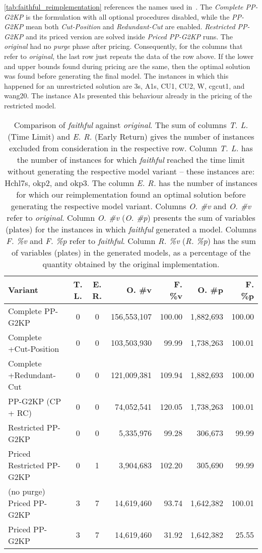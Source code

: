 \documentclass[smallextended]{svjour3}       %
\begin{document}
\autoref{tab:faithful_reimplementation} references the names used in~\cite{furini:2016,dimitri_thesis}.
The \emph{Complete PP-G2KP} is the formulation with all optional procedures disabled, while the \emph{PP-G2KP} mean both \emph{Cut-Position} and \emph{Redundant-Cut} are enabled.
\emph{Restricted PP-G2KP} and its priced version are solved inside \emph{Priced PP-G2KP} runs.
The \emph{original} had no \emph{purge} phase after pricing.
Consequently, for the columns that refer to \emph{original}, the last row just repeats the data of the row above.
If the lower and upper bounds found during pricing are the same, then the optimal solution was found before generating the final model.
The instances in which this happened for an unrestricted solution are 3s, A1s, CU1, CU2, W, cgcut1, and wang20.
The instance A1s presented this behaviour already in the pricing of the restricted model.

\begin{table}[ht]
\caption{Comparison of \emph{faithful} against \emph{original}.
The sum of columns \emph{T. L.} (Time Limit) and \emph{E. R.} (Early Return) gives the number of instances excluded from consideration in the respective row.
Column \emph{T. L.} has the number of instances for which \emph{faithful} reached the time limit without generating the respective model variant -- these instances are: Hchl7s, okp2, and okp3.
The column \emph{E. R.} has the number of instances for which our reimplementation found an optimal solution before generating the respective model variant.
Columns \emph{O. \#v} and \emph{O. \#v} refer to \emph{original}.
Column \emph{O. \#v} (\emph{O. \#p}) presents the sum of variables (plates) for the instances in which \emph{faithful} generated a model.
Columns \emph{F. \%v} and \emph{F. \%p} refer to \emph{faithful}.
Column \emph{R. \%v} (\emph{R. \%p}) has the sum of variables (plates) in the generated models, as a percentage of the quantity obtained by the original implementation.
}
\begin{tabular}{lccrrrr}
\hline\hline
Variant & T. L. & E. R. & O. \#v & F. \%v & O. \#p & F. \%p\\\hline
Complete PP-G2KP & 0 & 0 & 156,553,107 & 100.00 & 1,882,693 & 100.00\\
Complete +Cut-Position & 0 & 0 & 103,503,930 & 99.99 & 1,738,263 & 100.01\\
Complete +Redundant-Cut & 0 & 0 & 121,009,381 & 109.94 & 1,882,693 & 100.00\\
PP-G2KP (CP + RC) & 0 & 0 & 74,052,541 & 120.05 & 1,738,263 & 100.01\\
Restricted PP-G2KP & 0 & 0 & 5,335,976 & 99.28 & 306,673 & 99.99\\
Priced Restricted PP-G2KP & 0 & 1 & 3,904,683 & 102.20 & 305,690 & 99.99\\
(no purge) Priced PP-G2KP & 3 & 7 & 14,619,460 & 93.74 & 1,642,382 & 100.01\\
Priced PP-G2KP & 3 & 7 & 14,619,460 & 31.92 & 1,642,382 & 25.55\\\hline\hline
\end{tabular}
\label{tab:faithful_reimplementation}
\end{table}
\end{document}
